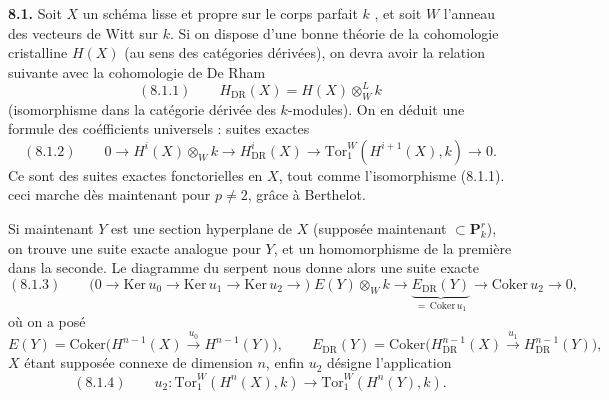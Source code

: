 \documentclass[11pt,a4paper]{article}
\begin{document}


\textbf{8.1.} Soit $X$ un schéma lisse et propre sur le corps parfait $k$
, et soit $W$ l'anneau des
vecteurs de Witt sur $k$. Si on dispose d'une bonne théorie de la cohomologie
cristalline $H(X)$ (au sens des catégories dérivées), on devra avoir la relation
suivante avec la cohomologie de De Rham
\[
(8.1.1) \qquad H_{\mathrm{DR}}(X) = H(X) \otimes^{L}_{W} k
\]
(isomorphisme dans la catégorie dérivée des $k$-modules). On en déduit une
formule des coéfficients universels : suites exactes
\[
(8.1.2) \qquad 0 \to H^{i}(X) \otimes_{W} k \to H^{i}_{\mathrm{DR}}(X)
\to \mathrm{Tor}^{W}_{1}(H^{i+1}(X), k) \to 0 .
\]
Ce sont des suites exactes fonctorielles en $X$, tout comme l'isomorphisme
(8.1.1).  ceci marche dès maintenant pour $p \neq 2$,
grâce à Berthelot.


Si maintenant $Y$ est une section hyperplane de 
$X$ (supposée maintenant $\subset \mathbf{P}^{r}_{k}$), on trouve une suite
exacte analogue pour $Y$, et un homomorphisme 
de la première dans la seconde. Le diagramme du serpent nous donne alors une
suite exacte
\[
(8.1.3) \qquad \bigl(0 \to \mathrm{Ker}\, u_{0} \to \mathrm{Ker}\, u_{1} \to
\mathrm{Ker}\, u_{2} \to\bigr)\; E(Y) \otimes_{W} k \to
\underbrace{E_{\mathrm{DR}}(Y)}_{=\,\mathrm{Coker}\, u_{1}}
\to \mathrm{Coker}\, u_{2} \to 0 ,
\]
où on a posé
\[
E(Y) = \mathrm{Coker}\bigl(H^{n-1}(X) \xrightarrow{u_{0}} H^{n-1}(Y)\bigr),
\qquad
E_{\mathrm{DR}}(Y) = \mathrm{Coker}\bigl(H^{n-1}_{\mathrm{DR}}(X)
\xrightarrow{u_{1}} H^{n-1}_{\mathrm{DR}}(Y)\bigr),
\]
$X$ étant supposée connexe de dimension $n$, enfin $u_{2}$ désigne
l'application
\[
(8.1.4) \qquad u_{2} : \mathrm{Tor}^{W}_{1}(H^{n}(X), k) \to
\mathrm{Tor}^{W}_{1}(H^{n}(Y), k).
\]
\end{document}
